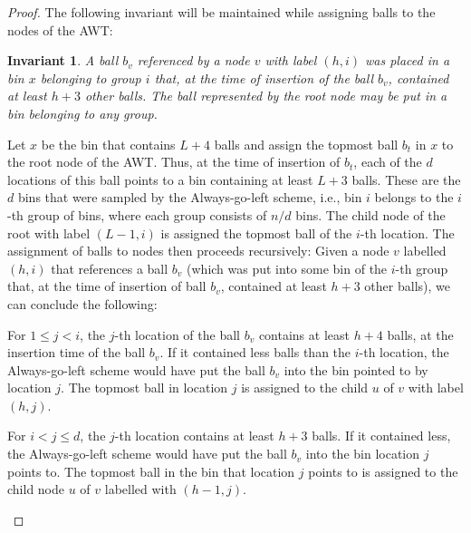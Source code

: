 \documentclass[a4paper,12pt]{article}
\newtheorem{invariant}{Invariant}
\begin{document}
\begin{proof}
The following invariant will be maintained while assigning balls to the nodes of the AWT:
\begin{invariant}
A ball $b_v$ referenced by a node $v$ with label $(h,i)$ was placed in a bin $x$ belonging to group $i$ that, at the time of insertion of the ball $b_v$, contained at least $h+3$ other balls. The ball represented by the root node may be put in a bin belonging to any group.
\end{invariant}
\noindent
Let $x$ be the bin that contains $L+4$ balls and assign the topmost ball $b_t$ in $x$ to the root node of the AWT. Thus, at the time of insertion of $b_t$, each of the $d$ locations of this ball points to a bin containing at least $L+3$ balls. These are the $d$ bins that were sampled by the Always-go-left scheme, i.e., bin $i$ belongs to the $i$-th group of bins, where each group consists of $n/d$ bins. The child node of the root with label $(L-1, i)$ is assigned the topmost ball of the $i$-th location. The assignment of balls to nodes then proceeds recursively: Given a node $v$ labelled $(h, i)$ that references a ball $b_v$ (which was put into some bin of the $i$-th group that, at the time of insertion of ball $b_v$, contained at least $h+3$ other balls), we can conclude the following:
\begin{compactitem}
\item For $1\leq j < i$, the $j$-th location of the ball $b_v$ contains at least $h+4$ balls, at the insertion time of the ball $b_v$. If it contained less balls than the $i$-th location, the Always-go-left scheme would have put the ball $b_v$ into the bin pointed to by location $j$. The topmost ball in location $j$ is assigned to the child $u$ of $v$ with label $(h,j)$. 
\item For $i < j \leq d$, the $j$-th location contains at least $h+3$ balls. If it contained less, the Always-go-left scheme would have put the ball $b_v$ into the bin location $j$ points to. The topmost ball in the bin that location $j$ points to is assigned to the child node $u$ of $v$ labelled with $(h-1, j)$.

\begin{comment}
Note: The paper claims that the locations $j$ point to bins with $h+2$ balls. This can not be true, since the topmost, i.e., the $h+2$-th ball - call it $b_t$ - gets assigned to a node with label $(h'=h-1, j)$. Since there are $h+1=h'+2$ balls below it, at the time of the placement of ball $b_t$, the bin $j$ it gets put into has only $h'+2$ balls in it, violating the invariant. Same with the case $j<i$.
\end{comment}
\end{compactitem}
\end{proof}
\end{document}
